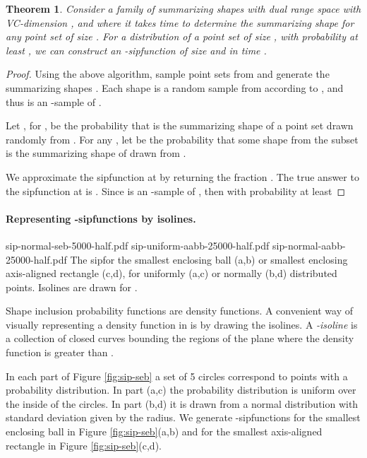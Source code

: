 \documentclass{journal}
\newcommand{\sip}{\textsf{sip\xspace}}
\newtheorem {theorem}{Theorem}[section]
\begin{document}
\begin{theorem}
Consider a family of summarizing shapes  with dual range space  with VC-dimension , and where it takes  time to determine the summarizing shape  for any point set  of size .
For a distribution  of a point set of size , with probability at least ,
we can construct an -\sip function of size 
and in time .
\label{thm:rand-sip}
\end{theorem}
\begin{proof}
Using the above algorithm, sample  point sets  from  and generate the  summarizing shapes .
Each shape is a random sample from  according to , and thus  is an -sample of .

Let , for , be the probability that  is the summarizing shape of a point set  drawn randomly from .
For any , let  be the probability that some shape from the subset  is the summarizing shape of  drawn from .

We approximate the \sip function at  by returning the fraction .
The true answer to the \sip function at  is .
Since  is an -sample of , then with probability at least 

\end{proof}



\paragraph{Representing -\sip functions by isolines.}

 {sip-normal-seb-5000-half.pdf} 
{sip-uniform-aabb-25000-half.pdf} {sip-normal-aabb-25000-half.pdf}
{ \label {fig:sip-seb} 
  The \sip for the smallest enclosing ball (a,b) or smallest enclosing 
  axis-aligned rectangle (c,d), for uniformly (a,c) or normally (b,d) 
  distributed points. Isolines are drawn for .
}

Shape inclusion probability functions are density functions.  A convenient way of visually representing a density function in  is by drawing the isolines.  A \emph{-isoline} is a collection of closed curves bounding the regions of the plane where the density function is greater than .

In each part of Figure \ref{fig:sip-seb} a set of 5 circles correspond to points with a probability distribution.   In part (a,c) the probability distribution is uniform over the inside of the circles.  In part (b,d) it is drawn from a normal distribution with standard deviation given by the radius.  We generate -\sip functions for the smallest enclosing ball in Figure \ref{fig:sip-seb}(a,b) and for the smallest axis-aligned rectangle in Figure \ref{fig:sip-seb}(c,d).
\end{document}

